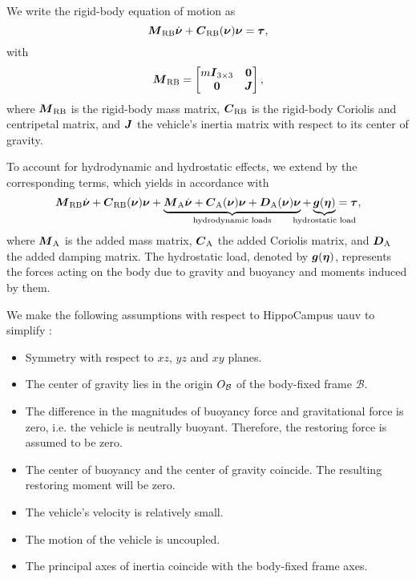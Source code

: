 We write the rigid-body equation of motion as
\begin{equation}
	\label{eq:rigid-body-equation-of-motion}
	\mbox{$\bm{M}$}_\text{RB} \mbox{$\dot{\bm{\nu}}$}
	+ \mbox{$\bm{C}$}_\text{RB}(\mbox{$\bm{\nu}$}) \mbox{$\bm{\nu}$}
	= \mbox{$\bm{\tau}$}
	,
\end{equation}
with
\begin{equation}
	\label{eq:rigid-body-mass-matrix}
	\mbox{$\bm{M}$}_\text{RB} =
	\begin{bmatrix}
		m \mbox{$\bm{I}$}_{3 \times 3} & \bm{0} \\
		\bm{0} & \mbox{$\bm{J}$}
	\end{bmatrix}
	,
\end{equation}
where $\mbox{$\bm{M}$}_\text{RB}$ is the rigid-body mass matrix, $\mbox{$\bm{C}$}_\text{RB}$ is the rigid-body Coriolis and centripetal matrix, and $\mbox{$\bm{J}$}$ the vehicle's inertia matrix with respect to its center of gravity.

To account for hydrodynamic and hydrostatic effects, we extend  by the corresponding terms, which yields in accordance with \cite{Fossen11}
\begin{equation}
	\label{eq:6dof-equation-of-motion}
	\Mrigid \nubp + \Crigid(\nub) \nub +
	\underbrace{
		\Madded \nubp +
		\Cadded(\nub) \nub +
		\Dadded(\nub) \nub
	}_\text{hydrodynamic loads}
	+ 
	\underbrace{
		\gb(\etab)
	}_\text{\makebox[0pt]{hydrostatic load}}
	= \taub
	,
\end{equation}
where $\mbox{$\bm{M}$}_\text{A}$ is the added mass matrix, $\mbox{$\bm{C}$}_\text{A}$ the added Coriolis matrix, and $\mbox{$\bm{D}$}_\text{A}$ the added damping matrix.
The hydrostatic load, denoted by $\mbox{$\bm{g}$}(\mbox{$\bm{\eta}$})$, represents the forces acting on the body due to gravity and buoyancy and moments induced by them.

We make the following assumptions with respect to HippoCampus \ac{uauv} to simplify :
\begin{itemize}
	\item Symmetry with respect to $xz$, $yz$ and $xy$ planes.
	\item The center of gravity lies in the origin $O_{\mathcal{B}}$ of the body-fixed frame $\mathcal{B}$.
	\item The difference in the magnitudes of buoyancy force and gravitational force is zero, i.e. the vehicle is neutrally buoyant. Therefore, the restoring force is assumed to be zero.
	\item The center of buoyancy and the center of gravity coincide. The resulting restoring moment will be zero.
	\item The vehicle's velocity is relatively small.
	\item The motion of the vehicle is uncoupled.
	\item The principal axes of inertia coincide with the body-fixed frame axes.
\end{itemize}


